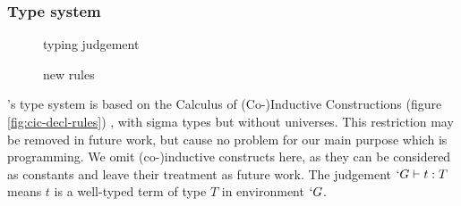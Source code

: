 \documentclass{llncs}
\begin{document}
\subsubsection{Type system}
\begin{figure}[h]
  \begin{center}
    \def\infvspace{0.1in}
    \def\seq{\typed}
    \def\fCenter{\wf}
    
    \WfEmpty\DP\WfVar\DP

    \def\fCenter{\typed}
    \vspace{\infvspace}

    \Var\DP\PropSet\DP
    
    \vspace{\infvspace}
    \Prod\DP
    
    \vspace{\infvspace}
    \Abs\DP
    \quad\hspace{-2.5em}
    \App\DP

    \vspace{\infvspace}
    \SigmaR\DP
    
    \vspace{\infvspace}
    \SumDep\DP

    \vspace{\infvspace}
    \PiLeft\DP
    \quad
    \PiRight\DP

    \vspace{\infvspace}
    \Conv\DP
  \end{center}
  \vspace{-2em}
  \caption{\CIC typing judgement}
  \label{fig:cic-decl-rules}
  \vspace{-1em}
\end{figure}


\begin{figure}[t]
  \begin{center}
    \def\infvspace{0.1in}
    \def\seq{\typed}
    \def\fCenter{\wf}
    \vspace{\infvspace}
    \Subsum\DP  
       
    \vspace{\infvspace}
    \SubsetR\DP
  \end{center}
  \vspace{-2em}
  \caption{\Russell new rules}
  \label{fig:typing-decl-rules}
  \vspace{-1em}
\end{figure}

%
\Russell{}'s type system is based on the Calculus of (Co-)Inductive
Constructions (figure \vref{fig:cic-decl-rules}) \cite{coquandhuet88},
with sigma types but without universes.  This restriction may be removed
in future work, but cause no problem for our main purpose which is
programming. We omit (co-)inductive constructs here, as they can be
considered as constants and leave their treatment as future work. The
judgement $`G \vdash t : T$ means $t$ is a well-typed term of type $T$
in environment $`G$.  
\end{document}
